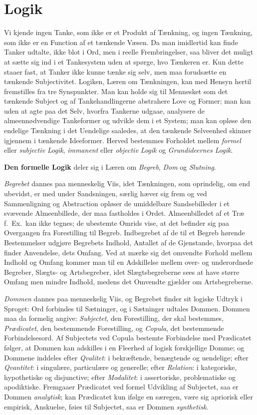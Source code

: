 \documentclass[12pt]{book}
\newcommand{\apage}[1]{\marginnote{\footnotesize\textit{[#1]}}}
\begin{document}
\section{Logik}
\label{sec:11}

\noindent Vi kjende ingen Tanke, som ikke er et Produkt af Tænkning, og
ingen Tænkning, som ikke er en Function af et tænkende Væsen. Da man
imidlertid kan finde Tanker udtalte, ikke blot i Ord, men i reelle
Frembringelser, saa bliver det muligt at sætte sig ind i et Tankesystem
uden at spørge, hvo Tænkeren er. Kun dette staaer fast, at Tanker ikke
kunne tænke sig selv, men maa forudsætte en tænkende Subjectivitet.
Logiken, Læren om Tænkningen, kan med Hensyn hertil fremstilles fra tre
Synspunkter. Man kan holde sig til Mennesket som det tænkende Subject og
af Tankehandlingerne abstrahere Love og Former; man kan uden at agte paa
det Selv, hvorfra Tankerne udgaae, analysere de almeennødvendige
Tankeformer og \apage{99} udvikle dem i et System; man kan opløse den endelige
Tænkning i det Uendelige saaledes, at den tænkende Selveenhed skinner
igjennem i tænkende Ideeformer. Herved bestemmes Forholdet mellem \emph{formel}
eller \emph{subjectiv Logik}, \emph{immanent} eller \emph{objectiv Logik} og \emph{Grundideernes
Logik}.

\textbf{Den formelle Logik} deler sig i Læren om \emph{Begreb}, \emph{Dom} og \emph{Slutning}.

\emph{Begrebet} dannes paa menneskelig Viis, idet Tænkningen, som oprindelig, om
end ubevidst, er med under Sandsningen, særlig hæver sig frem og ved
Sammenligning og Abstraction opløser de umiddelbare Sandsebilleder i et
svævende Almeenbillede, der maa fastholdes i Ordet. Almeenbilledet af et
Træ f.\ Ex.\ kan ikke tegnes; de ubestemte Omrids vise, at det befinder
sig paa Overgangen fra Forestilling til Begreb. Indbegrebet af de til et
Begreb hørende Bestemmelser udgjøre Begrebets Indhold, Antallet af de
Gjenstande, hvorpaa det finder Anvendelse, dets Omfang. Ved at mærke sig
det omvendte Forhold mellem Indhold og Omfang kommer man til en
Adskillelse mellem over- og underordnede Begreber, Slægts- og
Artsbegreber, idet Slægtsbegreberne sees at have større Omfang men mindre
Indhold, medens det Omvendte gjælder om Artsbegreberne.

\emph{Dommen} dannes paa menneskelig Viis, og Begrebet finder sit logiske Udtryk
i Sproget: Ord forbindes til Sætninger, og i Sætninger udtales Dommen.
Dommen maa da formelig angive: \emph{Subjectet}, den Forestilling, der skal
bestemmes, \emph{Prædicatet}, den \apage{100} bestemmende Forestilling, og \emph{Copula}, det
bestemmende Forbindelsesord. Af Subjectets ved Copula bestemte Forbindelse
med Prædicatet følger, at Dommen kan adskilles i en Fleerhed af logisk
forskjellige Domme; og Dommene inddeles efter \emph{Qvalitet}: i bekræftende,
benægtende og uendelige; efter \emph{Qvantitet}: i singulære, particulære og
generelle; efter \emph{Relation}: i kategoriske, hypothetiske og disjunctive;
efter \emph{Modalitet}: i assertoriske, problematiske og apodiktiske. Fremgaaer
Prædicatet ved formel Udvikling af Subjectet, saa er Dommen \emph{analytisk}; kan
Prædicatet kun ifølge en særegen, være sig apriorisk eller empirisk,
Anskuelse, føies til Subjectet, saa er Dommen \emph{synthetisk}.
\end{document}
